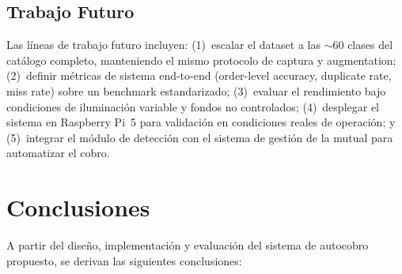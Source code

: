 \documentclass[conference,a4paper]{IEEEtran}[2015/08/26]
\begin{document}
\subsection{Trabajo Futuro}

Las líneas de trabajo futuro incluyen: (1)~escalar el dataset a las $\sim$60 clases del catálogo completo, manteniendo el mismo protocolo de captura y augmentation; (2)~definir métricas de sistema end-to-end (order-level accuracy, duplicate rate, miss rate) sobre un benchmark estandarizado; (3)~evaluar el rendimiento bajo condiciones de iluminación variable y fondos no controlados; (4)~desplegar el sistema en Raspberry Pi~5 para validación en condiciones reales de operación; y (5)~integrar el módulo de detección con el sistema de gestión de la mutual para automatizar el cobro.

\section{Conclusiones}
\label{sec:conclusiones}

A partir del diseño, implementación y evaluación del sistema de autocobro propuesto, se derivan las siguientes conclusiones:
\end{document}
